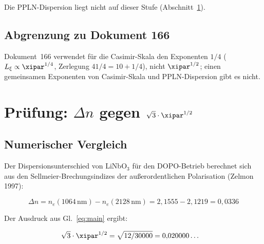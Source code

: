 Die PPLN-Dispersion liegt nicht auf dieser Stufe (Abschnitt~\ref{sec:hauptergebnis}).

\subsection{Abgrenzung zu Dokument 166}

Dokument~166 verwendet für die Casimir-Skala den Exponenten $1/4$
($L_\xi \propto \xipar^{1/4}$, Zerlegung $41/4 = 10 + 1/4$), nicht $\xipar^{1/2}$;
einen gemeinsamen Exponenten von Casimir-Skala und PPLN-Dispersion gibt es nicht.

\clearpage

\section{Prüfung: \texorpdfstring{$\Delta n$ gegen $\sqrt{3}\cdot\xipar^{1/2}$}{%
  Delta n vs. sqrt(3) xi\^{}(1/2)}}
\label{sec:hauptergebnis}

\subsection{Numerischer Vergleich}

Der Dispersionsunterschied von LiNbO$_3$ für den DOPO-Betrieb berechnet
sich aus den Sellmeier-Brechungsindizes der außerordentlichen Polarisation
(Zelmon 1997):

\begin{equation}
    \Delta n = n_e(1064\,\text{nm}) - n_e(2128\,\text{nm})
    = 2{,}1555 - 2{,}1219 = 0{,}0336
\end{equation}

Der Ausdruck aus Gl.~\eqref{eq:main} ergibt:

\begin{align}
    \sqrt{3}\cdot\xipar^{1/2}
    &= \sqrt{12/30000} = 0{,}020000\ldots
\end{align}

\begin{center}
\end{center}

